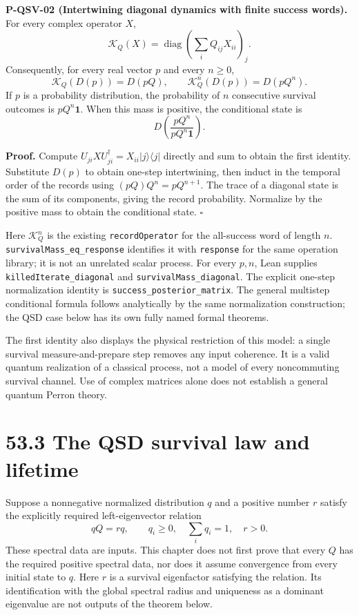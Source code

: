 \documentclass[
  11pt,
  oneside]{book}
\begin{document}
\label{p-qsv-02}{}

\textbf{P-QSV-02 (Intertwining diagonal dynamics with finite success
words).} For every complex operator \(X\), \[
\mathcal K_Q(X)=\operatorname{diag}\left(\sum_iQ_{ij}X_{ii}\right)_j.
\] Consequently, for every real vector \(p\) and every \(n\ge0\), \[
\mathcal K_Q(D(p))=D(pQ),\qquad
\mathcal K_Q^n(D(p))=D(pQ^n).
\] If \(p\) is a probability distribution, the probability of \(n\)
consecutive survival outcomes is \(pQ^n\mathbf1\). When this mass is
positive, the conditional state is \[
D\left(\frac{pQ^n}{pQ^n\mathbf1}\right).
\]

\textbf{Proof.} Compute
\(U_{ji}XU_{ji}^{\dagger}=X_{ii}|j\rangle\langle j|\) directly and sum
to obtain the first identity. Substitute \(D(p)\) to obtain one-step
intertwining, then induct in the temporal order of the records using
\((pQ)Q^n=pQ^{n+1}\). The trace of a diagonal state is the sum of its
components, giving the record probability. Normalize by the positive
mass to obtain the conditional state. \(\square\)

Here \(\mathcal K_Q^n\) is the existing \texttt{record\allowbreak Operator} for the
all-success word of length \(n\). \texttt{survival\allowbreak Mass\_\allowbreak eq\_\allowbreak response}
identifies it with \texttt{response} for the same operation library; it
is not an unrelated scalar process. For every \(p,n\), Lean supplies
\texttt{killed\allowbreak Iterate\_\allowbreak diagonal} and \texttt{survival\allowbreak Mass\_\allowbreak diagonal}.
The explicit one-step normalization identity is
\texttt{success\_\allowbreak posterior\_\allowbreak matrix}. The general multistep conditional
formula follows analytically by the same normalization construction; the
QSD case below has its own fully named formal theorems.

The first identity also displays the physical restriction of this model:
a single survival measure-and-prepare step removes any input coherence.
It is a valid quantum realization of a classical process, not a model of
every noncommuting survival channel. Use of complex matrices alone does
not establish a general quantum Perron theory.

\section{53.3 The QSD survival law and lifetime}

Suppose a nonnegative normalized distribution \(q\) and a positive
number \(r\) satisfy the explicitly required left-eigenvector relation
\[
qQ=rq,\qquad q_i\ge0,\quad \sum_iq_i=1,\quad r>0.
\] These spectral data are inputs. This chapter does not first prove
that every \(Q\) has the required positive spectral data, nor does it
assume convergence from every initial state to \(q\). Here \(r\) is a
survival eigenfactor satisfying the relation. Its identification with
the global spectral radius and uniqueness as a dominant eigenvalue are
not outputs of the theorem below.
\end{document}
